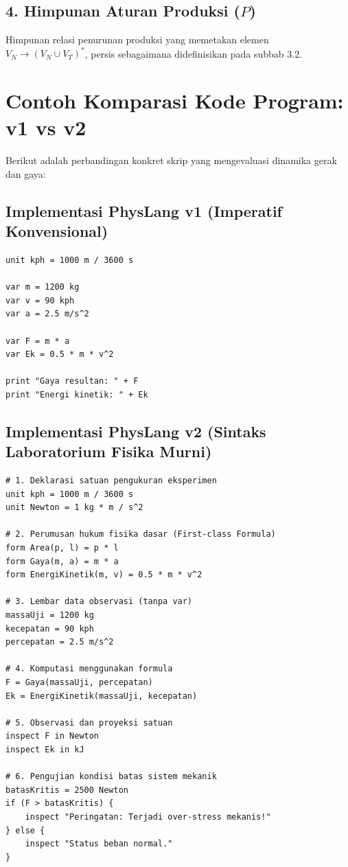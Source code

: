 \documentclass[11pt,a4paper]{article}
\begin{document}
\subsection{4. Himpunan Aturan Produksi ($P$)}
Himpunan relasi penurunan produksi yang memetakan elemen $V_N \to (V_N \cup V_T)^*$, persis sebagaimana didefinisikan pada subbab 3.2.

\section{Contoh Komparasi Kode Program: v1 vs v2}

Berikut adalah perbandingan konkret skrip yang mengevaluasi dinamika gerak dan gaya:

\subsection{Implementasi PhysLang v1 (Imperatif Konvensional)}
\begin{lstlisting}
unit kph = 1000 m / 3600 s

var m = 1200 kg
var v = 90 kph
var a = 2.5 m/s^2

var F = m * a
var Ek = 0.5 * m * v^2

print "Gaya resultan: " + F
print "Energi kinetik: " + Ek
\end{lstlisting}

\subsection{Implementasi PhysLang v2 (Sintaks Laboratorium Fisika Murni)}
\begin{lstlisting}
# 1. Deklarasi satuan pengukuran eksperimen
unit kph = 1000 m / 3600 s
unit Newton = 1 kg * m / s^2

# 2. Perumusan hukum fisika dasar (First-class Formula)
form Area(p, l) = p * l
form Gaya(m, a) = m * a
form EnergiKinetik(m, v) = 0.5 * m * v^2

# 3. Lembar data observasi (tanpa var)
massaUji = 1200 kg
kecepatan = 90 kph
percepatan = 2.5 m/s^2

# 4. Komputasi menggunakan formula
F = Gaya(massaUji, percepatan)
Ek = EnergiKinetik(massaUji, kecepatan)

# 5. Observasi dan proyeksi satuan
inspect F in Newton
inspect Ek in kJ

# 6. Pengujian kondisi batas sistem mekanik
batasKritis = 2500 Newton
if (F > batasKritis) {
    inspect "Peringatan: Terjadi over-stress mekanis!"
} else {
    inspect "Status beban normal."
}
\end{lstlisting}
\end{document}
